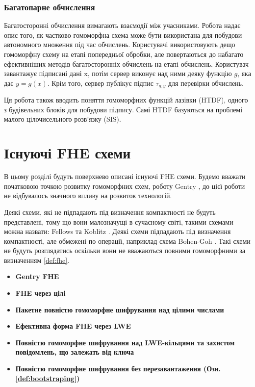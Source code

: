 \subsubsection*{Багатопарне обчислення}

Багатосторонні обчислення вимагають взаємодії між учасниками. Робота 
\cite{cryptoeprint:2011/535} надає опис того, як частково гомоморфна схема може бути
використана для побудови автономного множення під час обчислень. Користувачі використовують
дещо гомоморфну схему на етапі попередньої обробки, але повертаються до набагато ефективніших
методів багатосторонніх обчислень на етапі обчислень. Користувач завантажує підписані дані x,
потім сервер виконує над ними деяку функцію \(g\), яка дає \(y = g(x)\). Крім того, сервер
публікує підпис \(\tau_{g,y}\) для перевірки обчислень.

Ця робота також вводить поняття гомоморфних функцій лазівки (HTDF), одного з будівельних
блоків для побудови підпису. Самі HTDF базуються на проблемі малого цілочисельного розв'язку (SIS).

\section{Існуючі FHE схеми}
В цьому розділі будуть поверхнево описані існуючі FHE схеми. Будемо вважати початковою
точкою розвитку гомоморфних схем, роботу Gentry \cite{homenc}, до цієї роботи не 
відбувалось значного впливу на розвиток технологій.

Деякі схеми, які не підпадають під визначення компактності не будуть представлені, тому що
вони малозначущі в сучасному світі, такими схемами можна назвати: Fellows та Koblitz
\cite{fellows1994}. Деякі схеми підпадають під визначення компактності, але обмежені по
операції, наприклад схема Bohen-Goh \cite{10.1007/978-3-540-30576-7_18}. Такі схеми не
будуть розглядатись оскільки вони не вважаються повними гомоморфними за визначенням \ref{def:fhe}.

\begin{itemize}
    \item{\textbf{Gentry FHE \cite{homenc}} } 
    \item{\textbf{FHE через цілі \cite{cryptoeprint:2009/616}} }
    \item{\textbf{Пакетне повністю гомоморфне шифрування над цілими числами \cite{eurocrypt-2013-25038}} }
    \item{\textbf{Ефективна форма FHE через LWE \cite{cryptoeprint:2011/344}} }
    \item{\textbf{Повністю гомоморфне шифрування над LWE-кільцями та захистом повідомлень,
        що залежать від ключа \cite{10.1007/978-3-642-22792-9_29}} } 
    \item{\textbf{Повністю гомоморфне шифрування без перезавантаження (Озн. \ref{def:bootstraping}) \cite{journals/eccc/BrakerskiGV11}} }
\end{itemize}

